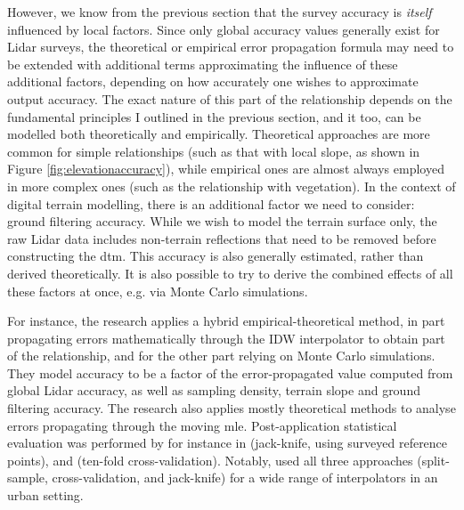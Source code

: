 However, we know from the previous section that the survey accuracy is \textit{itself} influenced by local factors. Since only global accuracy values generally exist for Lidar surveys, the theoretical or empirical error propagation formula may need to be extended with additional terms approximating the influence of these additional factors, depending on how accurately one wishes to approximate output accuracy. The exact nature of this part of the relationship depends on the fundamental principles I outlined in the previous section, and it too, can be modelled both theoretically and empirically. Theoretical approaches are more common for simple relationships (such as that with local slope, as shown in Figure \ref{fig:elevationaccuracy}), while empirical ones are almost always employed in more complex ones (such as the relationship with vegetation). In the context of digital terrain modelling, there is an additional factor we need to consider: ground filtering accuracy. While we wish to model the terrain surface only, the raw Lidar data includes non-terrain reflections that need to be removed before constructing the \ac{dtm}. This accuracy is also generally estimated, rather than derived theoretically. It is also possible to try to derive the combined effects of all these factors at once, e.g. via Monte Carlo simulations.

For instance, the research \cite{aguilar_etal_2010} applies a hybrid empirical-theoretical method, in part propagating errors mathematically through the IDW interpolator to obtain part of the relationship, and for the other part relying on Monte Carlo simulations. They model accuracy to be a factor of the error-propagated value computed from global Lidar accuracy, as well as sampling density, terrain slope and ground filtering accuracy. The research \cite{kraus_etal_2006} also applies mostly theoretical methods to analyse errors propagating through the moving \ac{mle}. Post-application statistical evaluation was performed by for instance in \cite{peng_shih_2006} (jack-knife, using surveyed reference points), and \cite{guo_etal_2010} (ten-fold cross-validation). Notably, \cite{smith_etal_2005} used all three approaches (split-sample, cross-validation, and jack-knife) for a wide range of interpolators in an urban setting.

